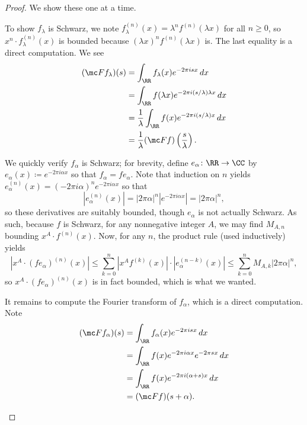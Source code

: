 \documentclass[notes.tex]{subfiles}
\begin{document}
\begin{proof}
	We show these one at a time.
	\begin{listalph}
		\item To show $f_\lambda$ is Schwarz, we note $f^{(n)}_\lambda(x)=\lambda^nf^{(n)}(\lambda x)$ for all $n\ge0$, so $x^n\cdot f^{(n)}_\lambda(x)$ is bounded because $(\lambda x)^nf^{(n)}(\lambda x)$ is. The last equality is a direct computation. We see
		\begin{align*}
			(\mc Ff_\lambda)(s) &= \int_\RR f_\lambda(x)e^{-2\pi isx}\,dx \\
			&= \int_\RR f(\lambda x)e^{-2\pi i(s/\lambda)\lambda x}\,dx \\
			&= \frac1\lambda\int_\RR f(x)e^{-2\pi i(s/\lambda)x}\,dx \\
			&= \frac1\lambda(\mc Ff)\left(\frac s\lambda\right).
		\end{align*}

		\item We quickly verify $f_\alpha$ is Schwarz; for brevity, define $e_\alpha\colon\RR\to\CC$ by $e_\alpha(x)\coloneqq e^{-2\pi i\alpha x}$ so that $f_\alpha=fe_\alpha$. Note that induction on $n$ yields $e_\alpha^{(n)}(x)=(-2\pi i\alpha)^ne^{-2\pi i\alpha x}$ so that
		\[\left|e_\alpha^{(n)}(x)\right|=|2\pi\alpha|^n\left|e^{-2\pi i\alpha x}\right|=|2\pi\alpha|^n,\]
		so these derivatives are suitably bounded, though $e_\alpha$ is not actually Schwarz. As such, because $f$ is Schwarz, for any nonnegative integer $A$, we may find $M_{A,n}$ bounding $x^A\cdot f^{(n)}(x)$. Now, for any $n$, the product rule (used inductively) yields
		\[\left|x^A\cdot(fe_\alpha)^{(n)}(x)\right|\le\sum_{k=0}^n\left|x^Af^{(k)}(x)\right|\cdot\left|e_\alpha^{(n-k)}(x)\right|\le\sum_{k=0}^nM_{A,k}|2\pi\alpha|^n,\]
		so $x^A\cdot(fe_\alpha)^{(n)}(x)$ is in fact bounded, which is what we wanted.

		It remains to compute the Fourier transform of $f_\alpha$, which is a direct computation. Note
		\begin{align*}
			(\mc Ff_\alpha)(s) &= \int_\RR f_\alpha(x)e^{-2\pi isx}\,dx \\
			&= \int_\RR f(x)e^{-2\pi i\alpha x}e^{-2\pi sx}\,dx \\
			&= \int_\RR f(x)e^{-2\pi i(\alpha+s)x}\,dx \\
			&= (\mc Ff)(s+\alpha).
		\end{align*}


\end{listalph}
\end{proof}
\end{document}
